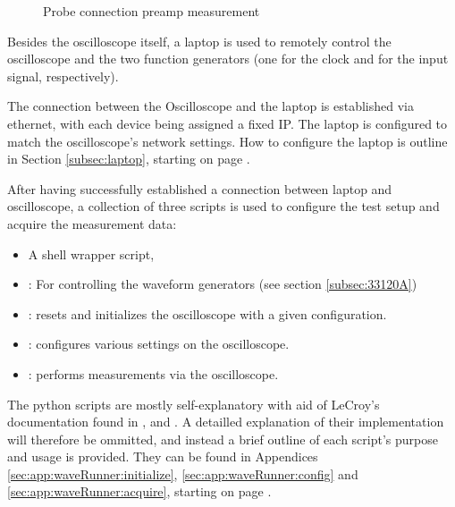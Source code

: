\begin{figure}
    \centering
    \caption{Probe connection preamp measurement}
    \label{fig:probePreamp}
\end{figure}

Besides the  oscilloscope itself,  a laptop  is used  to remotely  control the
oscilloscope and  the two function generators  (one for the clock  and for the
input signal, respectively).

The  connection  between  the  Oscilloscope  and  the  laptop  is  established
via  ethernet, with  each  device being  assigned a  fixed  IP. The laptop  is
configured  to match  the  oscilloscope's network  settings. How to  configure
the  laptop  is  outline  in Section  \ref{subsec:laptop},  starting  on  page
\pageref{subsec:laptop}.


After  having  successfully  established   a  connection  between  laptop  and
oscilloscope, a  collection of  three scripts  is used  to configure  the test
setup and acquire the measurement data:

\begin{itemize}\tightlist
    \item 
        A shell wrapper script, 
    \item
        : For controlling the waveform generators (see section
        \ref{subsec:33120A})
    \item 
        : resets and initializes the oscilloscope with
        a given configuration.
    \item 
        :   configures  various   settings  on   the
        oscilloscope.
    \item 
        :   performs   measurements   via   the
        oscilloscope.
\end{itemize}


The  python  scripts   are  mostly  self-explanatory  with   aid  of  LeCroy's
documentation   found  in   \cite{ref:WR:opMan},  \cite{ref:WR:gettingStarted}
and    \cite{ref:WR:remoteControl}. A   detailled    explanation   of    their
implementation   will   therefore   be   ommitted,   and   instead   a   brief
outline   of   each   script's   purpose  and   usage   is   provided.    They
can    be    found    in    Appendices    \ref{sec:app:waveRunner:initialize},
\ref{sec:app:waveRunner:config} and \ref{sec:app:waveRunner:acquire}, starting
on page \pageref{sec:app:waveRunner:initialize}.

